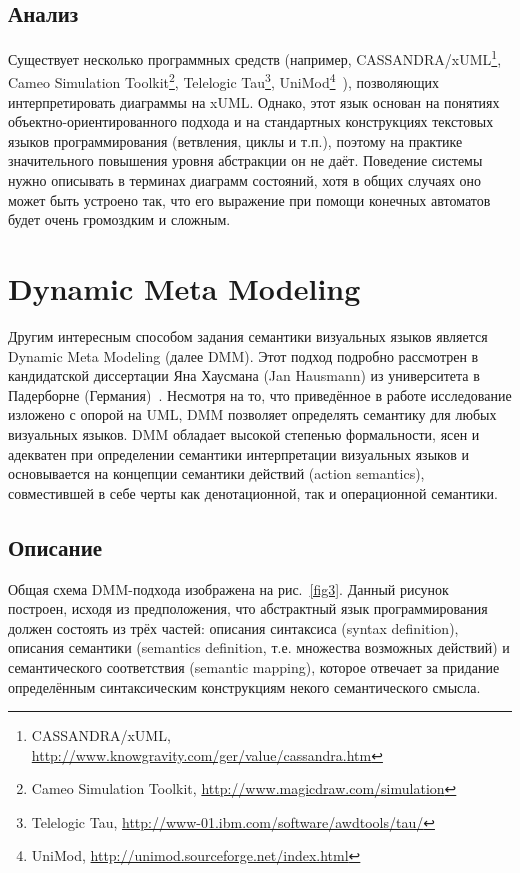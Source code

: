 \documentclass[a5paper]{article}
\begin{document}
\subsection{Анализ}

Существует несколько программных средств (например, CASSANDRA/xUML\footnote{CASSANDRA/xUML, \url{http://www.knowgravity.com/ger/value/cassandra.htm}}, Cameo Simulation Toolkit\footnote{Cameo Simulation Toolkit, \url{http://www.magicdraw.com/simulation}}, Telelogic Tau\footnote{Telelogic Tau, \url{http://www-01.ibm.com/software/awdtools/tau/}}, UniMod\footnote{UniMod, \url{http://unimod.sourceforge.net/index.html}}~\cite{unimod}), позволяющих интерпретировать диаграммы на xUML. Однако, этот язык основан на понятиях объектно-ориентированного подхода и на стандартных конструкциях текстовых языков программирования (ветвления, циклы и т.п.), поэтому на практике значительного повышения уровня абстракции он не даёт. Поведение системы нужно описывать в терминах диаграмм состояний, хотя в общих случаях оно может быть устроено так, что его выражение при помощи конечных автоматов будет очень громоздким и сложным.

\section{Dynamic Meta Modeling}

Другим интересным способом задания семантики визуальных языков является Dynamic Meta Modeling (далее DMM). Этот подход подробно рассмотрен в кандидатской диссертации Яна Хаусмана (Jan Hausmann) из университета в Падерборне (Германия)~\cite{dmm2}. Несмотря на то, что приведённое в работе исследование изложено с опорой на UML, DMM позволяет определять семантику для любых визуальных языков. DMM обладает высокой степенью формальности, ясен и адекватен при определении семантики интерпретации визуальных языков и основывается на концепции семантики действий (action semantics), совместившей в себе черты как денотационной, так и операционной семантики.

\subsection{Описание}

Общая схема DMM-подхода изображена на рис.~\ref{fig3}. Данный рисунок построен, исходя из предположения, что абстрактный язык программирования должен состоять из трёх частей: описания синтаксиса (syntax definition), описания семантики (semantics definition, т.е. множества возможных действий) и семантического соответствия (semantic mapping), которое отвечает за придание определённым синтаксическим конструкциям некого семантического смысла.
\end{document}
